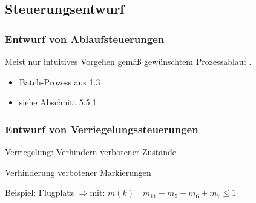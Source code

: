 \subsection{Steuerungsentwurf}
\subsubsection{Entwurf von Ablaufsteuerungen}
Meist nur intuitives Vorgehen gemäß gewünschtem Prozessablauf .

\begin{itemize}
	\item Batch-Prozess aus 1.3
	\item siehe Abschnitt 5.5.1
\end{itemize}

\subsubsection{Entwurf von Verriegelungssteuerungen}
Verriegelung: Verhindern verbotener Zustände 

Verhinderung verbotener Markierungen

Beispiel: Flugplatz 
$\Rightarrow \text{mit: } m(k) \quad m_{11}+m_{5}+m_{6}+m_{7} \le 1$

